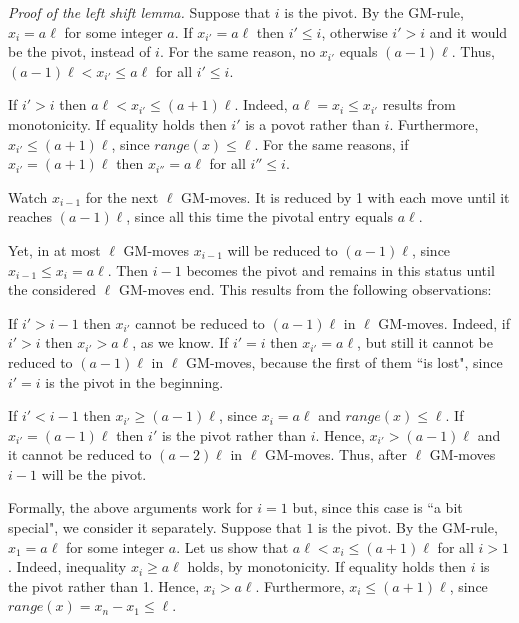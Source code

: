 \documentclass[10pt]{article}
\makeatletter
\renewcommand\subsection{\@startsection{subsection}{2}{\z@}
{-3.25ex\@plus -1ex \@minus -.2ex}
{1.5ex \@plus .2ex}
{\normalfont\normalsize\bfseries\boldmath}}
\theoremstyle{definition}
\makeatother
\begin{document}
\normalsize

\bigskip 

{\em Proof of the left shift lemma.} 
Suppose that  $i$  is the pivot. %
By the GM-rule, $x_i = a \ell$ for some integer $a$.  
If  $x_{i'} = a \ell$ then  $i' \leq i$, 
otherwise  $i' > i$  and it would be the pivot, instead of $i$. 
For the same reason, no  $x_{i'}$  equals $(a-1) \ell$.
Thus, $(a-1) \ell < x_{i'} \leq a \ell$  for all $i' \leq i$.

If $i' > i$ then $a \ell < x_{i'} \leq (a+1) \ell$. 
Indeed, $a \ell = x_i \leq x_{i'}$  results from monotonicity. 
If equality holds then $i'$  is a povot rather than $i$.  
Furthermore, $x_{i'} \leq (a+1) \ell$, 
since $range(x) \leq \ell$. 
For the same reasons, if  $x_{i'} = (a+1) \ell$ then  
$x_{i''} = a \ell$  for all $i'' \leq i$.   

Watch  $x_{i-1}$  for the next $\ell$  GM-moves. 
It is reduced by 1 with each move 
until it reaches $(a-1) \ell$, 
since all this time the pivotal entry equals $a \ell$. 

Yet, in at most  $\ell$  GM-moves  
$x_{i-1}$  will be reduced to $(a-1) \ell$, 
since $x_{i-1} \leq x_i = a \ell$.  
Then $i-1$ becomes the pivot and 
remains in this status 
until the considered  $\ell$  GM-moves end. 
This results from the following observations:    

If  $i' > i-1$  then $x_{i'}$  
cannot be reduced to $(a-1) \ell$ in $\ell$ GM-moves. 
Indeed, if  $i' > i$  then  $x_{i'} > a \ell$, as we know. 
If  $i' = i$  then  $x_{i'} = a \ell$, 
but still it cannot be reduced to $(a-1) \ell$
in $\ell$  GM-moves, 
because the first of them ``is lost", 
since  $i' = i$ is the pivot in the beginning. 

If  $i' < i - 1$  then $x_{i'} \geq (a-1) \ell$, 
since $x_i = a \ell$ and  $range(x) \leq \ell$. 
If  $x_{i'} = (a-1) \ell$ 
then $i'$  is the pivot rather than $i$. 
Hence,  $x_{i'} > (a-1) \ell$  and 
it cannot be reduced to 
$(a-2) \ell$  in $\ell$ GM-moves. 
Thus, after $\ell$  GM-moves $i-1$  will be the pivot. 

\medskip 

Formally, the above arguments work for $i=1$ 
but, since this case is ``a bit special", 
we consider it separately. 
Suppose that  $1$  is the pivot. %
By the GM-rule,  $x_1 = a \ell$  for some integer $a$.
Let us show that $a \ell < x_i \leq (a+1) \ell$ 
for all $i > 1$.
Indeed, inequality $x_i \geq a \ell$ holds, by monotonicity. 
If equality holds then $i$  is the pivot rather than 1. 
Hence, $x_i > a \ell$. 
Furthermore, $x_i \leq (a+1) \ell$, 
since $range(x) = x_n - x_1  \leq \ell$. 
\end{document}
